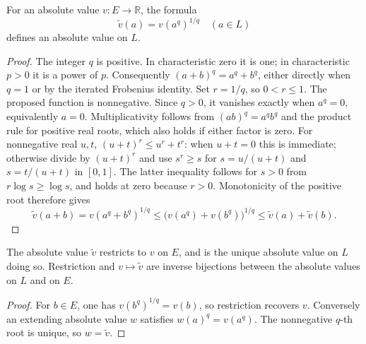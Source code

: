 \begin{lemma}
\label{lem:inseparable-absolute-value}
\leanok
{}
For an absolute value $v:E\to\mathbb R$, the formula
\[
 \widetilde v(a)=v(a^q)^{1/q}\quad(a\in L)
\]
defines an absolute value on $L$.
\end{lemma}
\begin{proof}
The integer $q$ is positive. In characteristic zero it is one; in
characteristic $p>0$ it is a power of $p$. Consequently
$(a+b)^q=a^q+b^q$, either directly when $q=1$ or by the iterated
Frobenius identity. Set $r=1/q$, so $0<r\leq1$.
The proposed function is nonnegative. Since $q>0$, it vanishes exactly
when $a^q=0$, equivalently $a=0$. Multiplicativity follows from
$(ab)^q=a^qb^q$ and the product rule for positive real roots, which
also holds if either factor is zero. For nonnegative real $u,t$,
$(u+t)^r\leq u^r+t^r$: when $u+t=0$ this is immediate; otherwise
divide by $(u+t)^r$ and use $s^r\geq s$ for
$s=u/(u+t)$ and $s=t/(u+t)$ in $[0,1]$. The latter inequality
follows for $s>0$ from $r\log s\geq\log s$, and holds at zero
because $r>0$. Monotonicity of the positive root therefore gives
\[
 \widetilde v(a+b)
 =v(a^q+b^q)^{1/q}
 \leq\bigl(v(a^q)+v(b^q)\bigr)^{1/q}
 \leq\widetilde v(a)+\widetilde v(b).
\]
\end{proof}

\begin{lemma}
\label{lem:inseparable-extension-unique}
\leanok
{}
The absolute value $\widetilde v$ restricts to $v$ on $E$, and is
the unique absolute value on $L$ doing so. Restriction and
$v\mapsto\widetilde v$ are inverse bijections between the absolute
values on $L$ and on $E$.
\end{lemma}
\begin{proof}
For $b\in E$, one has $v(b^q)^{1/q}=v(b)$, so restriction recovers
$v$. Conversely an extending absolute value $w$ satisfies
$w(a)^q=v(a^q)$. The nonnegative $q$-th root is unique, so
$w=\widetilde v$.
\end{proof}

